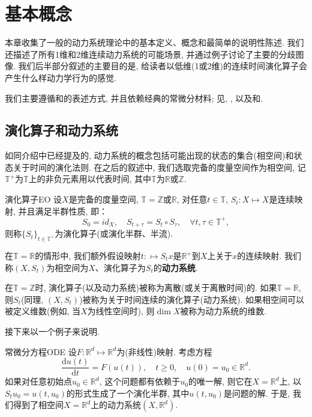 \chapter{基本概念}\label{cpt:1}

本章收集了一般的动力系统理论中的基本定义、概念和最简单的说明性陈述. 我们还描述了所有1维和2维连续动力系统的可能场景, 并通过例子讨论了主要的分歧图像. 我们后半部分叙述的主要目的是, 给读者以低维(1或2维)的连续时间演化算子会产生什么样动力学行为的感觉.

我们主要遵循\cite{Nemytskii60}和\cite{Sibirsky75}的表述方式, 并且依赖经典的常微分材料; 见\cite{Coddington55}, \cite{Hartman02}, \cite{Lefschetz77}以及\cite{Bautin90}和\cite{Reissing74}.

\section{演化算子和动力系统}
如同介绍中已经提及的, 动力系统的概念包括可能出现的状态的集合(相空间)和状态关于时间的演化法则. 在之后的叙述中, 我们选取完备的度量空间作为相空间, 记$\mathbb{T}^{+}$为$\mathbb{T}$上的非负元素用以代表时间, 其中$\mathbb{T}$为$\mathbb{R}$或$\mathbb{Z}$.

\begin{definition}{演化算子}{EO}
	设$X$是完备的度量空间, $\mathbb{T}=\mathbb{Z}$或$\mathbb{R}$, 对任意$t\in\mathbb{T}$, $S_{t}:X\mapsto X$是连续映射, 并且满足半群性质, 即：$$S_{0}=id_{X},\quad S_{t+\tau}=S_{t}\circ S_{\tau},\quad\forall t,\tau\in\mathbb{T}^{+},$$则称$\{S_{t}\}_{t\in \mathbb{T}^{+}}$为演化算子(或演化半群、半流). 
\end{definition}

在$\mathbb{T}=\mathbb{R}$的情形中, 我们额外假设映射$t:\mapsto S_{t}x$是$\mathbb{R}^{+}$到$X$上关于$x$的连续映射.  我们称$(X,S_{t})$为相空间为$X$、演化算子为$S_{t}$的\textbf{动力系统}. 

在$\mathbb{T}=\mathbb{Z}$时, 演化算子(以及动力系统)被称为离散(或关于离散时间)的.  如果$\mathbb{T}=\mathbb{R}$, 则$S_{t}$(同理, $(X,S_{t})$)被称为关于时间连续的演化算子(动力系统). 如果相空间可以被定义维数(例如, 当$X$为线性空间时), 则$\dim X$被称为动力系统的维数. 

接下来以一个例子来说明. 

\begin{example}{常微分方程}{ODE}
	设$F:\mathbb{R}^{d}\mapsto\mathbb{R}^{d}$为(非线性)映射. 考虑方程
	\begin{equation}\label{equ:exa1}
		\frac{\mathrm{d}u(t)}{\mathrm{d}t}=F(u(t)),\quad t\geqslant 0,\quad u(0)=u_{0}\in\mathbb{R}^{d}.
	\end{equation}
	如果对任意初始点$u_{0}\in\mathbb{R}^{d}$, 这个问题都有依赖于$u_{0}$的唯一解, 则它在$X=\mathbb{R}^{d}$上, 以$S_{t}u_{0}=u(t,u_{0})$的形式生成了一个演化半群, 其中$u(t,u_{0})$是问题的解. 于是, 我们得到了相空间$X=\mathbb{R}^{d}$上的动力系统$(X,\mathbb{R}^{d})$. 
\end{example}

